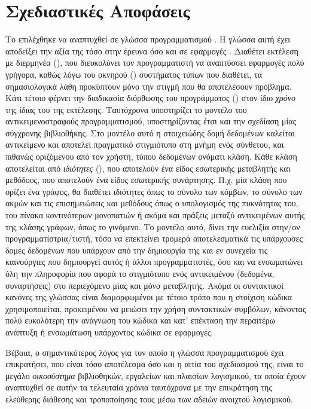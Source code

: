 \section{Σχεδιαστικές Αποφάσεις}
Το  επιλέχθηκε να αναπτυχθεί σε γλώσσα προγραμματισμού .
Η γλώσσα αυτή έχει αποδείξει την αξία της τόσο στην έρευνα όσο και σε εφαρμογές \cite{PythonHype}.
Διαθέτει εκτέλεση με διερμηνέα (), που διευκολύνει τον προγραμματιστή να αναπτύσσει εφαρμογές πολύ γρήγορα, καθώς λόγω του οκνηρού () συστήματος τύπων που διαθέτει, τα σημασιολογικά λάθη προκύπτουν μόνο την στιγμή που θα αποτελέσουν πρόβλημα.
Κάτι τέτοιο φέρνει την διαδικασία διόρθωσης του προγράμματος () στον ίδιο \textit{χρόνο} της ίδιας του της εκτέλεσης.
Ταυτόχρονα υποστηρίζει το μοντέλο του αντικειμενοστραφούς προγραμματισμού, υποστηρίζοντας έτσι και την σχεδίαση μίας σύγχρονης βιβλιοθήκης.
Στο μοντέλο αυτό η στοιχειώδης δομή δεδομένων καλείται αντικείμενο και αποτελεί πραγματικό στιγμιότυπο στη μνήμη ενός σύνθετου, και πιθανώς οριζόμενου από τον χρήστη, τύπου δεδομένων ονόματι κλάση.
Κάθε κλάση αποτελείται από  \textit{ιδιότητες} (), που αποτελούν ένα είδος εσωτερικής μεταβλητής και μεθόδους, που αποτελούν ένα είδος εσωτερικής συνάρτησης.
Π.χ. μία κλάση που ορίζει ένα γράφος, θα διαθέτει ιδιότητες όπως το σύνολο των κόμβων, το σύνολο των ακμών και τις επισημειώσεις και μεθόδους όπως ο υπολογισμός της πυκνότητας του, του πίνακα κοντινότερων μονοπατιών ή ακόμα και πράξεις μεταξύ αντικειμένων αυτής της κλάσης γράφων, όπως το γινόμενο.
Το μοντέλο αυτό, δίνει την ευελιξία στην/ον προγραμματίστρια/τιστή, τόσο να επεκτείνει τρομερά αποτελεσματικά τις υπάρχουσες δομές δεδομένων που υπάρχουν από την δημιουργία της και εν συνεχεία τις καινούργιες που δημιουργεί αυτός ή άλλοι προγραμματιστές, όσο και να ενσωματώνει όλη την πληροφορία που αφορά το στιγμιότυπο ενός αντικειμένου (δεδομένα, συναρτήσεις) στο περιεχόμενο μίας και μόνο μεταβλητής.
Ακόμα οι συντακτικοί κανόνες της γλώσσας είναι διαμορφωμένοι με τέτοιο τρόπο που η στοίχιση κώδικα χρησιμοποιείται, προκειμένου να μειώσει την χρήση συντακτικών συμβόλων, κάνοντας πολύ ευκολότερη την ανάγνωση του κώδικα και κατ' επέκταση την περαιτέρω ανάπτυξη ή ενσωμάτωση υπάρχοντος κώδικα σε εφαρμογές.\par
Bέβαια, ο σημαντικότερος λόγος για τον οποίο η γλώσσα προγραμματισμού  έχει επικρατήσει, που είναι τόσο αποτέλεσμα όσο και η αιτία του σχεδιασμού της, είναι το μεγάλο \textit{οικοσύστημα} βιβλιοθηκών, εργαλείων και πλαισίων λογισμικού, τα οποία έχουν αναπτυχθεί σε αυτήν τα τελευταία χρόνια ταυτόχρονα με την επικράτηση της ελεύθερης διάθεσης και τροποποίησης τους μέσω των αδειών ανοιχτού λογισμικού.
